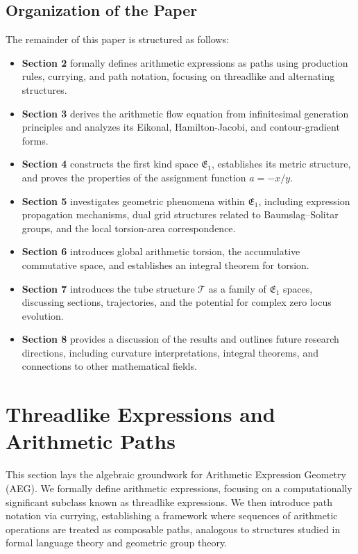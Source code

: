 \documentclass[12pt]{article}
\begin{document}
\subsection{Organization of the Paper}
The remainder of this paper is structured as follows:
\begin{itemize}
  \item \textbf{Section 2} formally defines arithmetic expressions as paths using production rules, currying, and path notation, focusing on threadlike and alternating structures.
  \item \textbf{Section 3} derives the arithmetic flow equation from infinitesimal generation principles and analyzes its Eikonal, Hamilton-Jacobi, and contour-gradient forms.
  \item \textbf{Section 4} constructs the first kind space \( \mathfrak{E}_1 \), establishes its metric structure, and proves the properties of the assignment function \(a=-x/y\).
  \item \textbf{Section 5} investigates geometric phenomena within \( \mathfrak{E}_1 \), including expression propagation mechanisms, dual grid structures related to Baumslag–Solitar groups, and the local torsion-area correspondence.
  \item \textbf{Section 6} introduces global arithmetic torsion, the accumulative commutative space, and establishes an integral theorem for torsion.
  \item \textbf{Section 7} introduces the tube structure \( \mathcal{T} \) as a family of \( \mathfrak{E}_1 \) spaces, discussing sections, trajectories, and the potential for complex zero locus evolution.
  \item \textbf{Section 8} provides a discussion of the results and outlines future research directions, including curvature interpretations, integral theorems, and connections to other mathematical fields.
\end{itemize}

\section{Threadlike Expressions and Arithmetic Paths}\label{sec:paths_cs}

This section lays the algebraic groundwork for Arithmetic Expression Geometry (AEG). We formally define arithmetic expressions, focusing on a computationally significant subclass known as threadlike expressions. We then introduce path notation via currying, establishing a framework where sequences of arithmetic operations are treated as composable paths, analogous to structures studied in formal language theory and geometric group theory.
\end{document}
